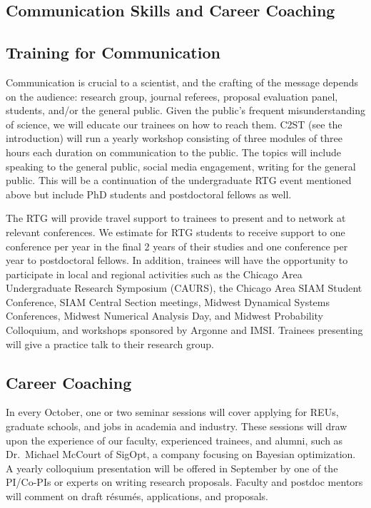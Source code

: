 \documentclass[11pt]{NSFamsart}
\begin{document}
\subsection{Communication Skills and Career Coaching}
\subsection*{Training for Communication}
Communication is crucial to a scientist, and the crafting of the message depends on the audience:  research group, journal referees, proposal evaluation panel, students, and/or the general public.  Given the public's frequent misunderstanding of science, we will educate our trainees on how to reach them.  C2ST (see the introduction) will run a yearly workshop consisting of three modules of three hours each duration on communication to the public.  The topics will include speaking to the general public, social media engagement, writing for the general public.  This will be a continuation of the undergraduate RTG event mentioned above but include PhD students and postdoctoral fellows as well.

The RTG will provide travel support to trainees to  present   and to network at relevant conferences. We estimate for RTG students to receive support to one conference per year in the final 2 years of their studies and one conference per year to postdoctoral fellows.  In addition, trainees will have the opportunity to participate in local and regional activities such as the Chicago Area Undergraduate Research Symposium (CAURS), the Chicago Area SIAM Student Conference, SIAM Central Section meetings, Midwest Dynamical Systems Conferences, Midwest Numerical Analysis Day, and Midwest Probability Colloquium, and workshops sponsored by Argonne and IMSI. Trainees presenting will give a practice talk to their research group.

\subsection*{Career Coaching}
In every October, one or two seminar sessions will cover applying for REUs, graduate schools, and jobs in academia and industry. These sessions will draw upon the experience of our faculty, experienced trainees, and alumni, such as Dr.\ Michael McCourt of SigOpt, a company focusing on Bayesian optimization.  A yearly colloquium presentation  will be offered in September by one of the PI/Co-PIs or experts on writing research proposals. Faculty and postdoc mentors will comment on draft r\'esum\'es,  applications, and proposals.  
\end{document}
